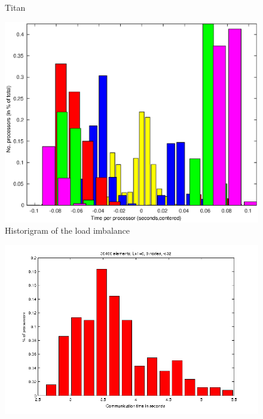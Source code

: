 \documentclass{sig-alternate}
\begin{document}
\begin{figure}
{  }
\caption{Titan}
\label{fig:scaling_titan}
\end{figure}

\begin{figure}
  \centering
  \includegraphics[width=\linewidth]{./figures/imbalancehist.eps}
  \caption{Historigram of the load imbalance}
  \label{fig:imbalancehist}
\end{figure}

\begin{figure}
  \centering
  \includegraphics[width=\linewidth]{./figures/loadbalance.png}
\end{figure}
\end{document}
